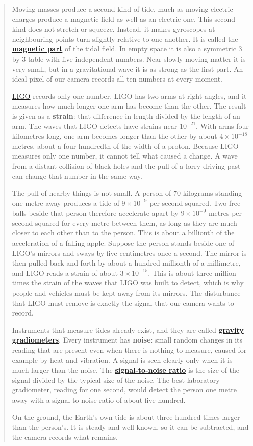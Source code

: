 \begin{quote}
Moving masses produce a second kind of tide, much as moving electric charges
produce a magnetic field as well as an electric one. This second kind does not
stretch or squeeze. Instead, it makes gyroscopes at neighbouring points turn
slightly relative to one another. It is called the
\textbf{\href{https://en.wikipedia.org/wiki/Gravitoelectromagnetism}{magnetic
part}} of the tidal field. In empty space it is also a symmetric 3 by 3 table with five
independent numbers. Near slowly moving matter it is very small, but in a
gravitational wave it is as strong as the first part. An ideal pixel of our
camera records all ten numbers at every moment.

\href{https://en.wikipedia.org/wiki/LIGO}{LIGO} records only one number. LIGO
has two arms at right angles, and it measures how much longer one arm has
become than the other. The result is given as a \textbf{strain}: that
difference in length divided by the length of an arm. The waves that LIGO
detects have strains near $10^{-21}$. With arms four kilometres long, one arm
becomes longer than the other by about $4\times10^{-18}$ metres, about a
four-hundredth of the width of a proton.
Because LIGO measures only one number, it cannot tell what caused a change. A
wave from a distant collision of black holes and the pull of a lorry driving
past can change that number in the same way.

The pull of nearby things is not small. A person of 70 kilograms standing one
metre away produces a tide of $9\times10^{-9}$ per second squared. Two free
balls beside that person therefore accelerate apart by $9\times10^{-9}$ metres
per second squared for every metre between them, as long as they are much
closer to each other than to the person. This is about a billionth of the
acceleration of a falling apple. Suppose the person stands beside one of LIGO's
mirrors and sways by five centimetres once a second. The mirror is then pulled
back and forth by about a hundred-millionth of a millimetre, and LIGO reads a
strain of about $3\times10^{-15}$. This is about three million times the strain
of the waves that LIGO was built to detect, which is why people and vehicles
must be kept away from its mirrors. The disturbance
that LIGO must remove is exactly the signal that our camera wants to record.

Instruments that measure tides already exist, and they are called
\textbf{\href{https://en.wikipedia.org/wiki/Gravity_gradiometry}{gravity
gradiometers}}. Every instrument has \textbf{noise}: small random changes in
its reading that are present even when there is nothing to measure, caused for
example by heat and vibration. A signal is seen clearly only when it is much
larger than the noise. The
\textbf{\href{https://en.wikipedia.org/wiki/Signal-to-noise_ratio}{signal-to-noise
ratio}} is the size of the signal divided by the typical size of the noise. The
best laboratory gradiometer, reading for one second, would detect the person
one metre away with a signal-to-noise ratio of about five hundred.

On the ground, the Earth's own tide is about three hundred times larger than
the person's. It is steady and well known, so it can be subtracted, and the
camera records what remains.
\end{quote}

